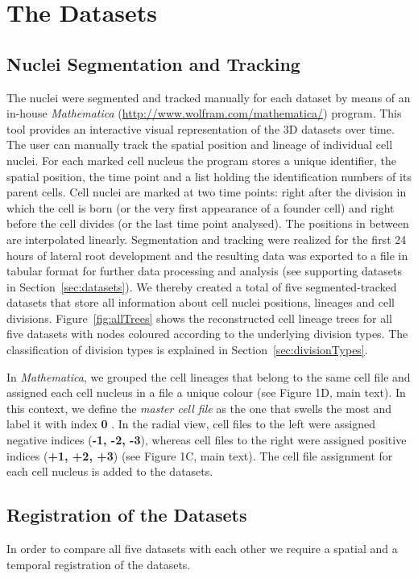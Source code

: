 \documentclass[11pt,a4paper, final]{article}
\begin{document}
\clearpage
\section{The Datasets}
\subsection{Nuclei Segmentation and Tracking}
\label{sec:segmentation}
\noindent
The nuclei were segmented and tracked manually for each dataset by means of an in-house \textit{Mathematica} (\href{http://www.wolfram.com/mathematica/}{http://www.wolfram.com/mathematica/}) program. This tool provides an interactive visual representation of the 3D datasets over time. The user can manually track the spatial position and lineage of individual cell nuclei. For each marked cell nucleus the program stores a unique identifier, the spatial position, the time point and a list holding the identification numbers of its parent cells. Cell nuclei are marked at two time points: right after the division in which the cell is born (or the very first appearance of a founder cell) and right before the cell divides (or the last time point analysed). The positions in between are interpolated linearly. Segmentation and tracking were realized for the first 24 hours of lateral root development and the resulting data was exported to a file in tabular format for further data processing and analysis (see supporting datasets in Section~\ref{sec:datasets}). We thereby created a total of five segmented-tracked datasets that store all information about cell nuclei positions, lineages and cell divisions. Figure~\ref{fig:allTrees} shows the reconstructed cell lineage trees for all five datasets with nodes coloured according to the underlying division types. The classification of division types is explained in Section~\ref{sec:divisionTypes}.

In \textit{Mathematica}, we grouped the cell lineages that belong to the same cell file and assigned each cell nucleus in a file a unique colour (see Figure 1D, main text). In this context, we define the \textit{master cell file} as the one that swells the most and label it with index \textbf{0} \cite{Vermeer:2014fl}. In the radial view, cell files to the left were assigned negative indices (\textbf{-1, -2, -3}), whereas cell files to the right were assigned positive indices (\textbf{+1, +2, +3}) (see Figure 1C, main text). The cell file assignment for each cell nucleus is added to the datasets.

\subsection{Registration of the Datasets}
\label{sec:registration}
\noindent
In order to compare all five datasets with each other we require a spatial and a temporal registration of the datasets. 
\end{document}
